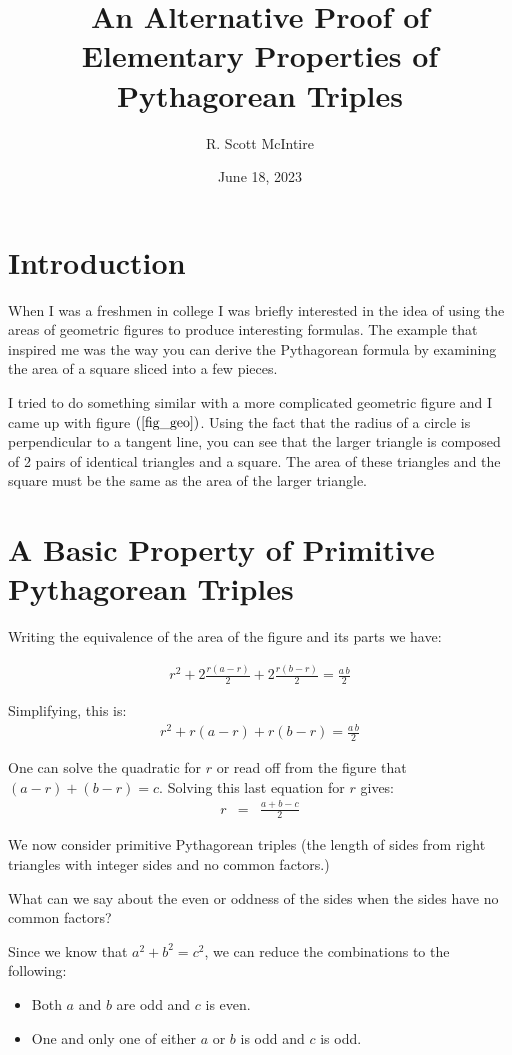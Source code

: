 \documentclass[12pt]{article}
\title{An Alternative Proof of Elementary Properties of Pythagorean Triples}
\author{R. Scott McIntire}
\date{June 18, 2023}
\begin{document}
\maketitle

\section{Introduction}
When I was a freshmen in college I was briefly interested in the idea of 
using the areas of geometric figures to
produce interesting formulas. The example that inspired me was the way you 
can derive the Pythagorean formula
by examining the area of a square sliced into a few pieces.

I tried to do something similar with a more complicated geometric figure and 
I came up with figure $(\ref{fig_geo})$.
Using the fact that the radius of a circle is perpendicular to a 
tangent line, you can see that the larger triangle
is composed of 2 pairs of identical triangles and a square. 
The area of these triangles and the square must be
the same as the area of the larger triangle. 

\section{A Basic Property of Primitive Pythagorean Triples}
Writing the equivalence of the area of the figure and its parts we have:

\begin{eqnarray}
r^2 + 2 \frac{r(a - r)}{2} + 2 \frac{r(b-r)}{2} = \frac{a\, b}{2} 
\end{eqnarray}

Simplifying, this is:
\begin{eqnarray}
r^2 + r(a - r) + r(b-r) = \frac{a\, b}{2} \label{area} 
\end{eqnarray}

One can solve the quadratic for $r$ or read off from the figure 
that $(a-r) + (b-r) = c$. Solving this last equation for $r$ gives:
\begin{eqnarray}
  r & = & \frac{a + b - c}{2} \label{radius}
\end{eqnarray}

We now consider primitive Pythagorean triples (the length of sides from right 
triangles with integer sides and no common factors.)

What can we say about the even or oddness of the sides when the sides have no 
common factors? 

Since we know that $a^2 + b^2 = c^2$, we can reduce the combinations to 
the following:
\begin{itemize}
  \item{Both $a$ and $b$ are odd and $c$ is even.}
  \item{One and only one of either $a$ or $b$ is odd and $c$ is odd.}
\end{itemize}
\end{document}
